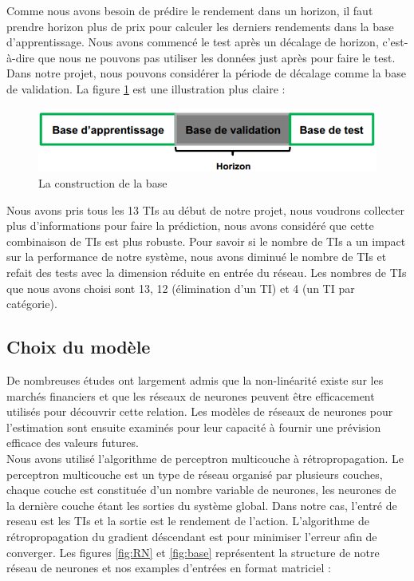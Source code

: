 Comme nous avons besoin de prédire le rendement dans un horizon, il faut prendre horizon plus de prix pour calculer les derniers rendements dans la base d'apprentissage. Nous avons commencé le test après un décalage de horizon, c'est-à-dire que nous ne pouvons pas utiliser les données just après pour faire le test. Dans notre projet, nous pouvons considérer la période de décalage comme la base de validation. La figure \ref{fig:BA} est une illustration plus claire : \\

\begin{figure}[H]
	\centering
	\includegraphics[width=.5\linewidth, scale=0.2]
	{plot/BA.png}
	\caption{La construction de la base}
	\label{fig:BA}
\end{figure}

Nous avons pris tous les 13 TIs au début de notre projet, nous voudrons collecter plus d’informations pour faire la prédiction, nous avons considéré que cette combinaison de TIs est plus robuste. Pour savoir si le nombre de TIs a un impact sur la performance de notre système, nous avons diminué le nombre de TIs et refait des tests avec la dimension réduite en entrée du réseau. Les nombres de TIs que nous avons choisi sont 13, 12 (élimination d'un TI) et 4 (un TI par catégorie).

\subsection{Choix du modèle}

De nombreuses études ont largement admis que la non-linéarité existe sur les marchés financiers et que les réseaux de neurones peuvent être efficacement utilisés pour découvrir cette relation. Les modèles de réseaux de neurones pour l'estimation sont ensuite examinés pour leur capacité à fournir une prévision efficace des valeurs futures.\\

Nous avons utilisé l'algorithme de perceptron multicouche à rétropropagation. Le perceptron multicouche est un type de réseau organisé par plusieurs couches, chaque couche est constituée d'un nombre variable de neurones, les neurones de la dernière couche étant les sorties du système global. Dans notre cas, l'entré de reseau est les TIs et la sortie est le rendement de l'action. L'algorithme de rétropropagation du gradient déscendant est pour minimiser l'erreur afin de converger. Les figures \ref{fig:RN} et \ref{fig:base} représentent la structure de notre réseau de neurones et nos examples d'entrées en format matriciel :\\

